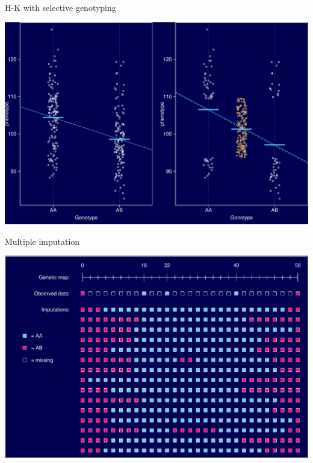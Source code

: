 \documentclass[12pt]{article}
\newcommand{\headsize}{\fontsize{35}{35} \selectfont}
\begin{document}
\newpage

\headsize \color{myyellow}
\hfill \begin{minipage}{5.75in}
\centering
H-K with selective genotyping
\end{minipage}

\vfill

\centerline{\includegraphics{Figs/hk_selgeno.pdf}}





\newpage

\headsize \color{myyellow}
\hfill \begin{minipage}{5.75in}
\centering
Multiple imputation
\end{minipage}

\vfill

\centerline{\includegraphics{Figs/imp.pdf}}


\newpage
\end{document}
